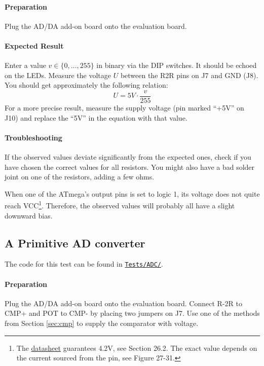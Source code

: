 \documentclass{article}
\newenvironment{note}{\begin{tcolorbox}[colback=blue!5!white,colframe=blue!75!black,title=\textbf{Note}]}{\end{tcolorbox}}
\newcommand{\file}[1]{\texttt{#1}}
\begin{document}
\paragraph{Preparation}
Plug the AD/DA add-on board onto the evaluation board. 

\paragraph{Expected Result}
Enter a value $v\in\{0,\ldots,255\}$ in binary via the DIP switches. It should be echoed on the LEDs. Measure the voltage $U$ between the R2R pins on J7 and GND (J8). You should get approximately the following relation:
\[
U=5V\cdot\frac{v}{255}
\]
For a more precise result, measure the supply voltage (pin marked ``+5V'' on J10) and replace the ``5V'' in the equation with that value. 

\paragraph{Troubleshooting}
If the observed values deviate significantly from the expected ones, check if you have chosen the correct values for all resistors. You might also have a bad solder joint on one of the resistors, adding a few ohms. 

\begin{note}
When one of the ATmega's output pins is set to logic 1, its voltage does not quite reach VCC\footnote{The \href{https://ww1.microchip.com/downloads/en/DeviceDoc/doc2593.pdf}{datasheet} guarantees 4.2V, see Section 26.2. The exact value depends on the current sourced from the pin, see Figure 27-31.}. Therefore, the observed values will probably all have a slight downward bias. 
\end{note}

\subsection{A Primitive AD converter}
The code for this test can be found in \href{../Tests/ADC/}{\file{Tests/ADC/}}. 

\paragraph{Preparation}
Plug the AD/DA add-on board onto the evaluation board. Connect R-2R to CMP+ and POT to CMP- by placing two jumpers on J7. 
Use one of the methods from Section \ref{sec:cmp} to supply the comparator with voltage. 
\end{document}
